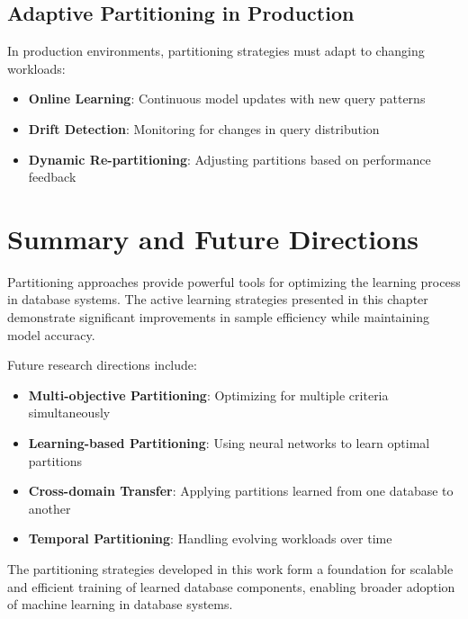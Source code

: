 \subsection{Adaptive Partitioning in Production}

In production environments, partitioning strategies must adapt to changing workloads:

\begin{itemize}
    \item \textbf{Online Learning}: Continuous model updates with new query patterns
    \item \textbf{Drift Detection}: Monitoring for changes in query distribution
    \item \textbf{Dynamic Re-partitioning}: Adjusting partitions based on performance feedback
\end{itemize}

\section{Summary and Future Directions}

Partitioning approaches provide powerful tools for optimizing the learning process in database systems. The active learning strategies presented in this chapter demonstrate significant improvements in sample efficiency while maintaining model accuracy.

Future research directions include:

\begin{itemize}
    \item \textbf{Multi-objective Partitioning}: Optimizing for multiple criteria simultaneously
    \item \textbf{Learning-based Partitioning}: Using neural networks to learn optimal partitions
    \item \textbf{Cross-domain Transfer}: Applying partitions learned from one database to another
    \item \textbf{Temporal Partitioning}: Handling evolving workloads over time
\end{itemize}

The partitioning strategies developed in this work form a foundation for scalable and efficient training of learned database components, enabling broader adoption of machine learning in database systems.